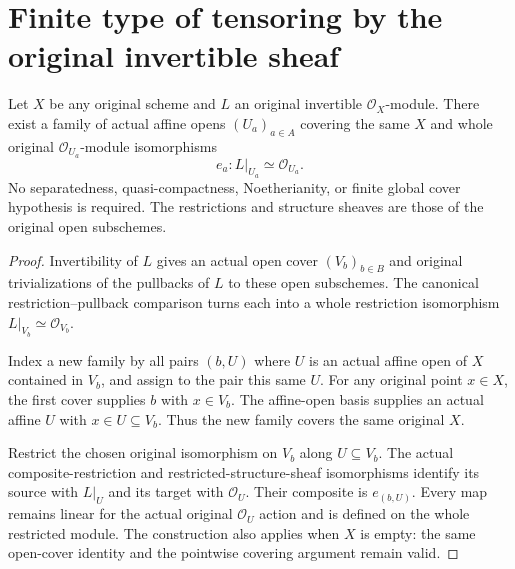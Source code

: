 \section{Finite type of tensoring by the original invertible sheaf}

\begin{lemma}
\label{lem:scheme-original-invertible-affine-frames}
\leanok
Let $X$ be any original scheme and $L$ an original invertible
$\mathcal O_X$-module. There exist a family of actual affine opens
$(U_a)_{a\in A}$ covering the same $X$ and whole original
$\mathcal O_{U_a}$-module isomorphisms
\[
 e_a:L|_{U_a}\simeq\mathcal O_{U_a}.
\]
No separatedness, quasi-compactness, Noetherianity, or finite global
cover hypothesis is required. The restrictions and structure sheaves
are those of the original open subschemes.
\end{lemma}
\begin{proof}
Invertibility of $L$ gives an actual open cover $(V_b)_{b\in B}$
and original trivializations of the pullbacks of $L$ to these open
subschemes. The canonical restriction--pullback comparison turns
each into a whole restriction isomorphism
$L|_{V_b}\simeq\mathcal O_{V_b}$.

Index a new family by all pairs $(b,U)$ where $U$ is an actual affine
open of $X$ contained in $V_b$, and assign to the pair this same $U$.
For any original point $x\in X$, the first cover supplies $b$ with
$x\in V_b$. The affine-open basis supplies an actual affine $U$
with $x\in U\subseteq V_b$. Thus the new family covers the same
original $X$.

Restrict the chosen original isomorphism on $V_b$ along $U\subseteq V_b$.
The actual composite-restriction and restricted-structure-sheaf
isomorphisms identify its source with $L|_U$ and its target with
$\mathcal O_U$. Their composite is $e_{(b,U)}$.
Every map remains linear for the actual original $\mathcal O_U$
action and is defined on the whole restricted module.
The construction also applies when $X$ is empty: the same open-cover
identity and the pointwise covering argument remain valid.
\end{proof}

